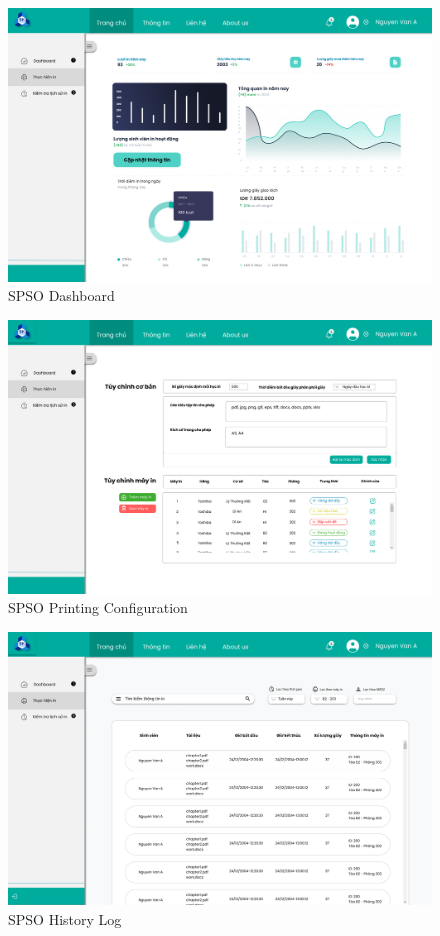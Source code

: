 \documentclass[a4paper]{report}
\begin{document}
\begin{figure}[H]
    \centering
    \includegraphics[width = \textwidth, ]{images/UI/Bảng điều khiển SPSO.png}
    \caption{SPSO Dashboard}
\end{figure}  

\begin{figure}[H]
    \centering
    \includegraphics[width = \textwidth, ]{images/UI/Thay đổi in SPSO.png}
    \caption{SPSO Printing Configuration}
\end{figure}  

\begin{figure}[H]
    \centering
    \includegraphics[width = \textwidth, ]{images/UI/Tra lịch sử SPSO.png}
    \caption{SPSO History Log}
\end{figure}  
\end{document}
